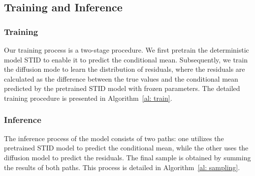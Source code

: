 \subsection{Training and Inference}


\subsubsection*{\textbf{Training}}
Our training process is a two-stage procedure. We first pretrain the deterministic model STID to enable it to predict the conditional mean. Subsequently, we train the diffusion mode to learn the distribution of residuals, where the residuals are calculated as the difference between the true values and the conditional mean predicted by the pretrained STID model with frozen parameters. The detailed training procedure is presented in Algorithm~\ref{al: train}.
\subsubsection*{\textbf{Inference}}
The inference process of the model consists of two paths: one utilizes the pretrained STID model to predict the conditional mean, while the other uses the diffusion model to predict the residuals. The final sample is obtained by summing the results of both paths. This process is detailed in Algorithm~\ref{al: sampling}.